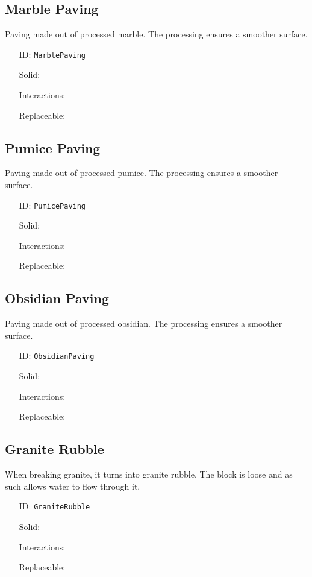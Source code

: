 \subsection{Marble Paving}\label{subsec:blocks_marble paving}
Paving made out of processed marble.
                The processing ensures a smoother surface.
\newline
\begin{itemize}[nosep]
\item[ID:] \texttt{MarblePaving}
\item[Solid:]  \Checkmark \item[Interactions:]  \XSolidBrush \item[Replaceable:]  \XSolidBrush \end{itemize}

\subsection{Pumice Paving}\label{subsec:blocks_pumice paving}
Paving made out of processed pumice.
                The processing ensures a smoother surface.
\newline
\begin{itemize}[nosep]
\item[ID:] \texttt{PumicePaving}
\item[Solid:]  \Checkmark \item[Interactions:]  \XSolidBrush \item[Replaceable:]  \XSolidBrush \end{itemize}

\subsection{Obsidian Paving}\label{subsec:blocks_obsidian paving}
Paving made out of processed obsidian.
                The processing ensures a smoother surface.
\newline
\begin{itemize}[nosep]
\item[ID:] \texttt{ObsidianPaving}
\item[Solid:]  \Checkmark \item[Interactions:]  \XSolidBrush \item[Replaceable:]  \XSolidBrush \end{itemize}

\subsection{Granite Rubble}\label{subsec:blocks_granite rubble}
When breaking granite, it turns into granite rubble.
                The block is loose and as such allows water to flow through it.
\newline
\begin{itemize}[nosep]
\item[ID:] \texttt{GraniteRubble}
\item[Solid:]  \Checkmark \item[Interactions:]  \XSolidBrush \item[Replaceable:]  \XSolidBrush \end{itemize}

